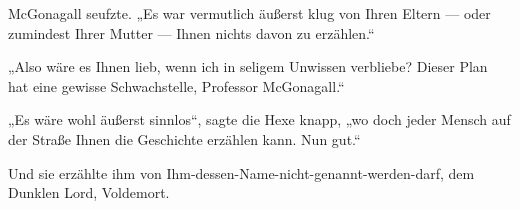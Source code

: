 McGonagall seufzte.
„Es war vermutlich äußerst klug von Ihren Eltern — oder zumindest Ihrer Mutter — Ihnen nichts davon zu erzählen.“

„Also wäre es Ihnen lieb, wenn ich in seligem Unwissen verbliebe? Dieser Plan hat eine gewisse Schwachstelle, Professor McGonagall.“

„Es wäre wohl äußerst sinnlos“, sagte die Hexe knapp, „wo doch jeder Mensch auf der Straße Ihnen die Geschichte erzählen kann. Nun gut.“

Und sie erzählte ihm von Ihm-dessen-Name-nicht-genannt-werden-darf, dem Dunklen Lord, Voldemort.

